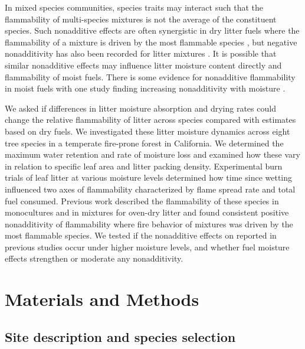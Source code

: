 \documentclass[letterpaper,12pt]{article}
\begin{document}
In mixed species communities, species traits may interact such that the
flammability of multi-species mixtures is not the average of the constituent
species. Such nonadditive effects are often synergistic in dry litter fuels
where the flammability of a mixture is driven by the most flammable species
\citep{VanAltena+Logtestjin+etal-2012, Magalhaes+Schwilk-2012}, but negative
nonadditivity has also been recorded for litter mixtures
\citep{Blauw+Wensink+etal-2015, Zhao+vanLogtestijn+etal-2019}. It is possible that
similar nonadditive effects may influence litter moisture content directly and
flammability of moist fuels. There is some evidence for nonadditive
flammability in moist fuels with one study finding increasing nonadditivity
with moisture \citep{Blauw+Wensink+etal-2015}.

We asked if differences in litter moisture absorption and drying rates could
change the relative flammability of litter across species compared with
estimates based on dry fuels. We investigated these litter moisture dynamics
across eight tree species in a temperate fire-prone forest in California. We
determined the maximum water retention and rate of moisture loss and examined
how these vary in relation to specific leaf area and litter packing density.
Experimental burn trials of leaf litter at various moisture levels determined
how time since wetting influenced two axes of flammability characterized by
flame spread rate and total fuel consumed. Previous work described the
flammability of these species in monocultures and in mixtures for oven-dry
litter \citep{Magalhaes+Schwilk-2012} and found consistent positive
nonadditivity of flammability where fire behavior of mixtures was driven by the
most flammable species. We tested if the nonadditive effects on reported in
previous studies occur under higher moisture levels, and whether fuel moisture
effects strengthen or moderate any nonadditivity.


\section*{Materials and Methods}

\subsection*{Site description and species selection}
\end{document}
